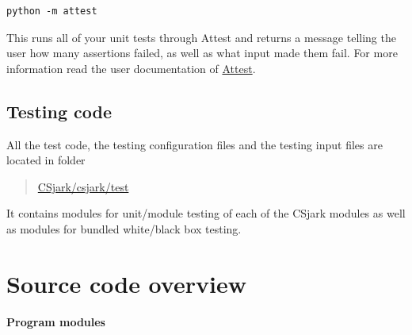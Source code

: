 \documentclass[A4paper,10pt,english]{sphinxmanual}
\begin{document}
\begin{Verbatim}[commandchars=\\\{\}]
python -m attest
\end{Verbatim}

This runs all of your unit tests through Attest and returns a message telling the user how many assertions failed, as well as what input made them fail. For more information read the user documentation of \href{http://packages.python.org/Attest/}{Attest}.


\subsection{Testing code}
\label{devel/testing:attest}\label{devel/testing:testing-code}
All the test code, the testing configuration files and the testing input files are located in folder
\begin{quote}

\href{https://github.com/eventh/kpro9/tree/master/CSjark/csjark/test}{CSjark/csjark/test}
\end{quote}

It contains modules for unit/module testing of each of the CSjark modules as well as modules for bundled white/black box testing.


\section{Source code overview}
\label{devel/code::doc}\label{devel/code:source-code-overview}
\textbf{Program modules}
\end{document}
